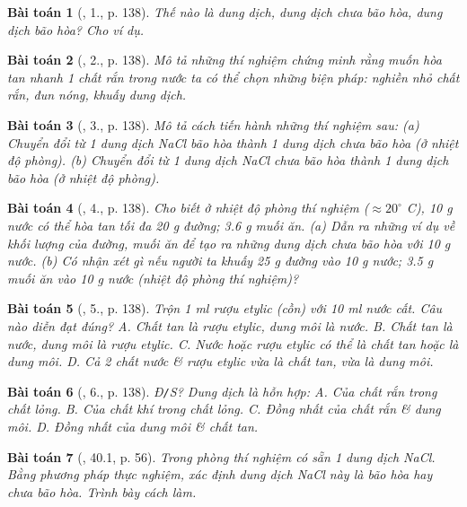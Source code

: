 \documentclass{article}
\newtheorem{baitoan}{Bài toán}
\begin{document}
\begin{baitoan}[\cite{SGK_Hoa_Hoc_8}, 1., p. 138]
	Thế nào là dung dịch, dung dịch chưa bão hòa, dung dịch bão hòa? Cho ví dụ.
\end{baitoan}

\begin{baitoan}[\cite{SGK_Hoa_Hoc_8}, 2., p. 138]
	Mô tả những thí nghiệm chứng minh rằng muốn hòa tan nhanh 1 chất rắn trong nước ta có thể chọn những biện pháp: nghiền nhỏ chất rắn, đun nóng, khuấy dung dịch.
\end{baitoan}	

\begin{baitoan}[\cite{SGK_Hoa_Hoc_8}, 3., p. 138]
	Mô tả cách tiến hành những thí nghiệm sau: (a) Chuyển đổi từ 1 dung dịch \emph{NaCl} bão hòa thành 1 dung dịch chưa bão hòa (ở nhiệt độ phòng). (b) Chuyển đổi từ 1 dung dịch \emph{NaCl} chưa bão hòa thành 1 dung dịch bão hòa (ở nhiệt độ phòng).
\end{baitoan}

\begin{baitoan}[\cite{SGK_Hoa_Hoc_8}, 4., p. 138]
	Cho biết ở nhiệt độ phòng thí nghiệm ($\approx20^\circ$ C), \emph{10 g} nước có thể hòa tan tối đa \emph{20 g} đường; \emph{3.6 g} muối ăn. (a) Dẫn ra những ví dụ về khối lượng của đường, muối ăn để tạo ra những dung dịch chưa bão hòa với \emph{10 g} nước. (b) Có nhận xét gì nếu người ta khuấy \emph{25 g} đường vào \emph{10 g} nước; \emph{3.5 g} muối ăn vào \emph{10 g} nước (nhiệt độ phòng thí nghiệm)?
\end{baitoan}

\begin{baitoan}[\cite{SGK_Hoa_Hoc_8}, 5., p. 138]
	Trộn \emph{1 ml} rượu etylic (cồn) với \emph{10 ml} nước cất. Câu nào diễn đạt đúng? {\sf A.} Chất tan là rượu etylic, dung môi là nước. {\sf B.} Chất tan là nước, dung môi là rượu etylic. {\sf C.} Nước hoặc rượu etylic có thể là chất tan hoặc là dung môi. {\sf D.} Cả 2 chất nước \& rượu etylic vừa là chất tan, vừa là dung môi.
\end{baitoan}

\begin{baitoan}[\cite{SGK_Hoa_Hoc_8}, 6., p. 138]
	\emph{Đ\texttt{/}S?} Dung dịch là hỗn hợp: {\sf A.} Của chất rắn trong chất lỏng. {\sf B.} Của chất khí trong chất lỏng. {\sf C.} Đồng nhất của chất rắn \& dung môi. {\sf D.} Đồng nhất của dung môi \& chất tan.
\end{baitoan}

\begin{baitoan}[\cite{SBT_Hoa_Hoc_8}, 40.1, p. 56]
	Trong phòng thí nghiệm có sẵn 1 dung dịch \emph{NaCl}. Bằng phương pháp thực nghiệm, xác định dung dịch \emph{NaCl} này là bão hòa hay chưa bão hòa. Trình bày cách làm.
\end{baitoan}
\end{document}
